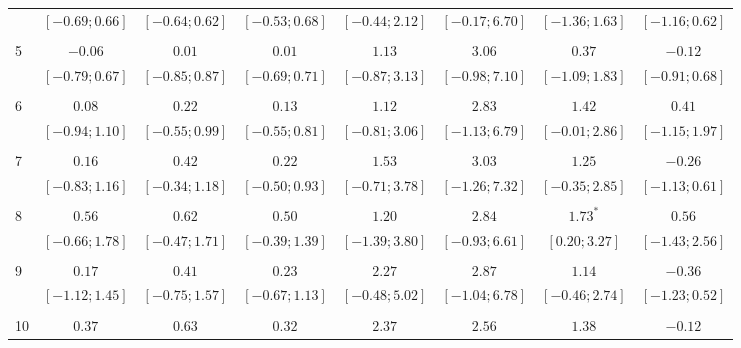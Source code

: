 \documentclass[12pt]{amsart}
\begin{document}
\begin{table}
{\begin{tabular}{l c c c c c c c}
   & $ [-0.69; 0.66]$ & $ [-0.64; 0.62]$ & $ [-0.53; 0.68]$ & $ [-0.44; 2.12]$ & $ [-0.17; 6.70]$ & $ [-1.36; 1.63]$ & $ [-1.16; 0.62]$ \\
   &       &       &       &       &       &       &       \\
5  & $-0.06$          & $0.01$           & $0.01$           & $1.13$           & $3.06$           & $0.37$           & $-0.12$          \\
   & $ [-0.79; 0.67]$ & $ [-0.85; 0.87]$ & $ [-0.69; 0.71]$ & $ [-0.87; 3.13]$ & $ [-0.98; 7.10]$ & $ [-1.09; 1.83]$ & $ [-0.91; 0.68]$ \\
   &       &       &       &       &       &       &       \\
6  & $0.08$           & $0.22$           & $0.13$           & $1.12$           & $2.83$           & $1.42$           & $0.41$           \\
   & $ [-0.94; 1.10]$ & $ [-0.55; 0.99]$ & $ [-0.55; 0.81]$ & $ [-0.81; 3.06]$ & $ [-1.13; 6.79]$ & $ [-0.01; 2.86]$ & $ [-1.15; 1.97]$ \\
   &       &       &       &       &       &       &       \\
7  & $0.16$           & $0.42$           & $0.22$           & $1.53$           & $3.03$           & $1.25$           & $-0.26$          \\
   & $ [-0.83; 1.16]$ & $ [-0.34; 1.18]$ & $ [-0.50; 0.93]$ & $ [-0.71; 3.78]$ & $ [-1.26; 7.32]$ & $ [-0.35; 2.85]$ & $ [-1.13; 0.61]$ \\
   &       &       &       &       &       &       &       \\
8  & $0.56$           & $0.62$           & $0.50$           & $1.20$           & $2.84$           & $1.73^{*}$       & $0.56$           \\
   & $ [-0.66; 1.78]$ & $ [-0.47; 1.71]$ & $ [-0.39; 1.39]$ & $ [-1.39; 3.80]$ & $ [-0.93; 6.61]$ & $ [ 0.20; 3.27]$ & $ [-1.43; 2.56]$ \\
   &       &       &       &       &       &       &       \\
9  & $0.17$           & $0.41$           & $0.23$           & $2.27$           & $2.87$           & $1.14$           & $-0.36$          \\
   & $ [-1.12; 1.45]$ & $ [-0.75; 1.57]$ & $ [-0.67; 1.13]$ & $ [-0.48; 5.02]$ & $ [-1.04; 6.78]$ & $ [-0.46; 2.74]$ & $ [-1.23; 0.52]$ \\
   &       &       &       &       &       &       &       \\
10 & $0.37$           & $0.63$           & $0.32$           & $2.37$           & $2.56$           & $1.38$           & $-0.12$          \\

\end{tabular}}
\end{table}
\end{document}
